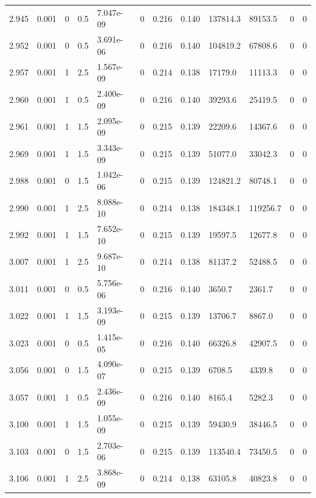 \documentclass[preview]{standalone}
\begin{document}
{{{{{\begin{tabular}{L{1.2cm}C{1.2cm} C{0.3cm}C{0.5cm} C{1.4cm}C{1.4cm} C{1.4cm}C{1.4cm} C{1.6cm}C{1.6cm} C{1.6cm}C{1.6cm}}
  2.945  &  0.001  & 0     & 0.5 &  7.047e-09  & 0  &  0.216&   0.140& 137814.3 & 89153.5   &  0 & 0  \\ 
  2.952  &  0.001  & 0     & 0.5 &  3.691e-06  & 0  &  0.216&   0.140& 104819.2 & 67808.6   &  0 & 0  \\ 
  2.957  &  0.001  & 1     & 2.5 &  1.567e-09  & 0  &  0.214&   0.138& 17179.0 & 11113.3   &  0 & 0  \\ 
  2.960  &  0.001  & 1     & 0.5 &  2.400e-09  & 0  &  0.216&   0.140& 39293.6 & 25419.5   &  0 & 0  \\ 
  2.961  &  0.001  & 1     & 1.5 &  2.095e-09  & 0  &  0.215&   0.139& 22209.6 & 14367.6   &  0 & 0  \\ 
  2.969  &  0.001  & 1     & 1.5 &  3.343e-09  & 0  &  0.215&   0.139& 51077.0 & 33042.3   &  0 & 0  \\ 
  2.988  &  0.001  & 0     & 1.5 &  1.042e-06  & 0  &  0.215&   0.139& 124821.2 & 80748.1   &  0 & 0  \\ 
  2.990  &  0.001  & 1     & 2.5 &  8.088e-10  & 0  &  0.214&   0.138& 184348.1 & 119256.7   &  0 & 0  \\ 
  2.992  &  0.001  & 1     & 1.5 &  7.652e-10  & 0  &  0.215&   0.139& 19597.5 & 12677.8   &  0 & 0  \\ 
  3.007  &  0.001  & 1     & 2.5 &  9.687e-10  & 0  &  0.214&   0.138& 81137.2 & 52488.5   &  0 & 0  \\ 
  3.011  &  0.001  & 0     & 0.5 &  5.756e-06  & 0  &  0.216&   0.140& 3650.7 & 2361.7   &  0 & 0  \\ 
  3.022  &  0.001  & 1     & 1.5 &  3.193e-09  & 0  &  0.215&   0.139& 13706.7 & 8867.0   &  0 & 0  \\ 
  3.023  &  0.001  & 0     & 0.5 &  1.415e-05  & 0  &  0.216&   0.140& 66326.8 & 42907.5   &  0 & 0  \\ 
  3.056  &  0.001  & 0     & 1.5 &  4.090e-07  & 0  &  0.215&   0.139& 6708.5 & 4339.8   &  0 & 0  \\ 
  3.057  &  0.001  & 1     & 0.5 &  2.436e-09  & 0  &  0.216&   0.140& 8165.4 & 5282.3   &  0 & 0  \\ 
  3.100  &  0.001  & 1     & 1.5 &  1.055e-09  & 0  &  0.215&   0.139& 59430.9 & 38446.5   &  0 & 0  \\ 
  3.103  &  0.001  & 0     & 1.5 &  2.703e-06  & 0  &  0.215&   0.139& 113540.4 & 73450.5   &  0 & 0  \\ 
  3.106  &  0.001  & 1     & 2.5 &  3.868e-09  & 0  &  0.214&   0.138& 63105.8 & 40823.8   &  0 & 0  \\ 

\end{tabular}}}}}}
\end{document}
